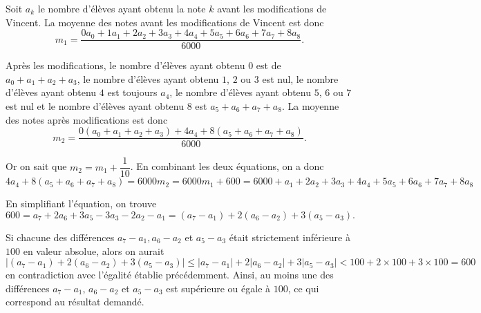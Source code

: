 Soit $a_k$ le nombre d'élèves ayant obtenu la note $k$ avant les modifications de Vincent. La moyenne des notes avant les modifications de Vincent est donc
$$m_1 = \frac{0a_0 + 1a_1 + 2a_2 + 3a_3 + 4a_4 + 5a_5 + 6a_6 + 7a_7 + 8a_8}{6000}.$$

Après les modifications, le nombre d'élèves ayant obtenu $0$ est de $a_0 + a_1 + a_2 + a_3$, le nombre d'élèves ayant obtenu $1$,
$2$ ou $3$ est nul, le nombre d'élèves ayant obtenu $4$ est toujours $a_4$, le nombre d'élèves ayant obtenu $5$, $6$ ou $7$ est nul et le nombre d'élèves ayant obtenu $8$ est $a_5 + a_6 + a_7 + a_8$. La moyenne des notes après modifications est donc
$$m_2 = \frac{0(a_0 + a_1 + a_2 + a_3) + 4a_4 + 8(a_5 + a_6 + a_7 + a_8)}{6000}.$$

Or on sait que $m_2 = m_1 + \dfrac{1}{10}$. En combinant les deux équations, on a donc
$$4a_4 + 8(a_5 + a_6 + a_7 + a_8) = 6000m_2 = 6000m_1 + 600 = 6000 + a_1 + 2a_2 + 3a_3 + 4a_4 + 5a_5 + 6a_6 + 7a_7 + 8a_8$$

En simplifiant l'équation, on trouve
$$600 = a_7 + 2a_6 + 3a_5 - 3a_3 - 2a_2 - a_1 = (a_7 - a_1) + 2(a_6 - a_2) + 3(a_5 - a_3).$$

Si chacune des différences $a_7 - a_1, a_6 - a_2$ et $a_5 - a_3$ était strictement inférieure à $100$ en valeur absolue, alors on aurait
$$|(a_7 - a_1) + 2(a_6 - a_2) + 3(a_5 - a_3)| \le |a_7 - a_1| + 2|a_6 - a_2| + 3|a_5 - a_3| < 100 + 2\times 100 + 3\times 100 = 600$$
en contradiction avec l'égalité établie précédemment.
Ainsi, au moins une des différences $a_7 - a_1$, $a_6 - a_2$ et $a_5 - a_3$ est supérieure ou égale à $100$, ce qui correspond au résultat demandé.